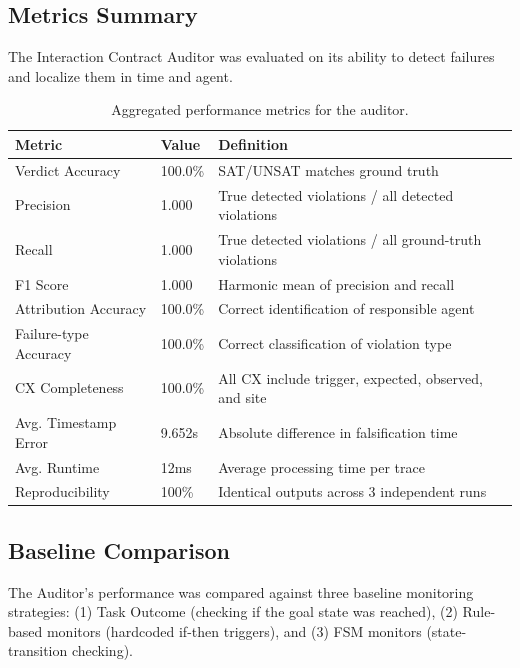 \documentclass[10pt, letterpaper]{article}
\begin{document}
\subsection{Metrics Summary}
The Interaction Contract Auditor was evaluated on its ability to detect failures and localize them in time and agent.

\begin{table}[H]
\centering
\begin{tabular}{lll}
\toprule
\textbf{Metric} & \textbf{Value} & \textbf{Definition} \\
\midrule
Verdict Accuracy & 100.0\% & SAT/UNSAT matches ground truth \\
Precision & 1.000 & True detected violations / all detected violations \\
Recall & 1.000 & True detected violations / all ground-truth violations \\
F1 Score & 1.000 & Harmonic mean of precision and recall \\
Attribution Accuracy & 100.0\% & Correct identification of responsible agent \\
Failure-type Accuracy & 100.0\% & Correct classification of violation type \\
CX Completeness & 100.0\% & All CX include trigger, expected, observed, and site \\
Avg. Timestamp Error & 9.652s & Absolute difference in falsification time \\
Avg. Runtime & 12ms & Average processing time per trace \\
Reproducibility & 100\% & Identical outputs across 3 independent runs \\
\bottomrule
\end{tabular}
\caption{Aggregated performance metrics for the auditor.}
\end{table}

\subsection{Baseline Comparison}
The Auditor's performance was compared against three baseline monitoring strategies: (1) Task Outcome (checking if the goal state was reached), (2) Rule-based monitors (hardcoded if-then triggers), and (3) FSM monitors (state-transition checking).
\end{document}
